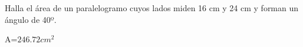\documentclass[addpoints,spanish, 12pt,a4paper]{exam}
\begin{document}
\begin{questions}
\begin{parts}

\question[1] Halla el área de un paralelogramo cuyos lados miden 16 cm y 24 cm y forman un
ángulo de 40º.
\begin{solution}
A=$246.72 cm^2$
\end{solution}

\end{parts}
\end{questions}
\end{document}
